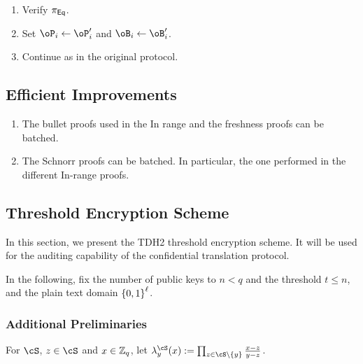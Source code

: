 \begin{enumerate}
\begin{enumerate}
\begin{enumerate}
					\item Verify $\pi_{\sf Eq}$.
				
				\item Set $\oP_i  \asn \oP_i'$  and $\oB_i  \asn \oB_i'$.
				
				\item Continue as in the original protocol.
			\end{enumerate}
		
	\end{enumerate}
\end{enumerate}


\subsection{Efficient Improvements}\label{sec:ChanksEg:EfficientImp}

\begin{enumerate}
	\item The bullet proofs used  in the In range and the freshness proofs can be batched. 
	
	\item The Schnorr proofs can be batched. In particular, the one performed in the different In-range proofs.  
\end{enumerate}



\newcommand{\tdKg}{\MathAlgX{TshGen}}

\newcommand{\tdEnc}{\MathAlgX{TshEnc}}
\newcommand{\tdDec}{\MathAlgX{TshDec}}

\subsection{Threshold Encryption Scheme }\label{sec:ChanksEg:TDH}	

In this section, we present   the TDH2 threshold  encryption scheme. 
It will be used for the  auditing capability  of the confidential translation protocol.  

In the following, fix the number of public keys to $n<q$ and the threshold $t \le n$, and the plain text domain $\zo^\ell$. 


\subsubsection{Additional Preliminaries}\label{sec:ChanksEg:TDH:Pre}	
\begin{notation}
 	For $\cS$, $z\in \cS$ and $x\in {\mathbb Z}_q$, let $\lambda_y^\cS(x) \eqdef \prod_{z \in \cS \setminus \set{y}} \frac{x-z}{y-z}$.
\end{notation}

